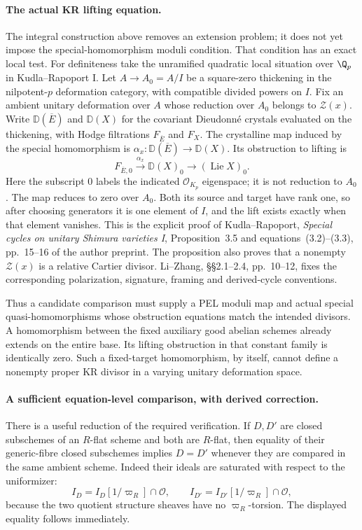 \paragraph{The actual KR lifting equation.}
The integral construction above removes an extension problem;
it does not yet impose the special-homomorphism moduli condition.
That condition has an exact local test.
For definiteness take the unramified quadratic local situation
over $\Q_p$ in Kudla--Rapoport I.
Let $A\to A_0=A/I$ be a square-zero thickening in the
nilpotent-$p$ deformation category, with compatible divided
powers on $I$.  Fix an ambient unitary deformation over $A$
whose reduction over $A_0$ belongs to $\mathcal Z(x)$.
Write $\mathbb D(\overline E)$ and $\mathbb D(X)$ for the
covariant Dieudonn\'e crystals evaluated on the thickening,
with Hodge filtrations $F_{\overline E}$ and $F_X$.
The crystalline map induced by the special homomorphism is
$\alpha_x:\mathbb D(\overline E)\to\mathbb D(X)$.
Its obstruction to lifting is
\begin{equation}\label{C23-obstruction}
 F_{\overline E,0}\xrightarrow{\alpha_x}
       \mathbb D(X)_0\longrightarrow(\operatorname{Lie}X)_0.
\end{equation}
Here the subscript $0$ labels the indicated
$\mathcal O_{K_p}$ eigenspace; it is not reduction to $A_0$.
The map reduces to zero over $A_0$.
Both its source and target have rank one, so after choosing
generators it is one element of $I$, and the lift exists
exactly when that element vanishes.
This is the explicit proof of Kudla--Rapoport,
\emph{Special cycles on unitary Shimura varieties I},
Proposition~3.5 and equations~(3.2)--(3.3), pp.~15--16
of the author preprint.  The proposition also proves that a
nonempty $\mathcal Z(x)$ is a relative Cartier divisor.
Li--Zhang, \S\S2.1--2.4, pp.~10--12, fixes the corresponding
polarization, signature, framing and derived-cycle conventions.

Thus a candidate comparison must supply a PEL moduli map
and actual special quasi-homomorphisms whose obstruction
equations match the intended divisors.  A homomorphism between
the fixed auxiliary good abelian schemes already extends on
the entire base.  Its lifting obstruction in that constant
family is identically zero.  Such a fixed-target homomorphism,
by itself, cannot define a nonempty proper KR divisor in a
varying unitary deformation space.

\paragraph{A sufficient equation-level comparison, with derived correction.}
There is a useful reduction of the required verification.
If $D,D'$ are closed subschemes of an $R$-flat scheme and
both are $R$-flat, then equality of their generic-fibre
closed subschemes implies $D=D'$ whenever they are compared
in the same ambient scheme.  Indeed their ideals are saturated
with respect to the uniformizer:
\[
 I_D=I_D[1/\varpi_R]\cap\mathcal O,
       \qquad
 I_{D'}=I_{D'}[1/\varpi_R]\cap\mathcal O,
\]
because the two quotient structure sheaves have no
$\varpi_R$-torsion.  The displayed equality follows immediately.

